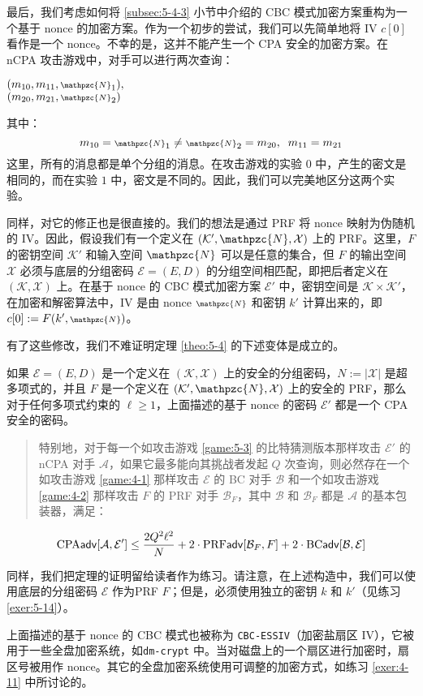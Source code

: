 最后，我们考虑如何将 \ref{subsec:5-4-3} 小节中介绍的 CBC 模式加密方案重构为一个基于 nonce 的加密方案。作为一个初步的尝试，我们可以先简单地将 IV $c[0]$ 看作是一个 nonce。不幸的是，这并不能产生一个 CPA 安全的加密方案。在 nCPA 攻击游戏中，对手可以进行两次查询：

\vspace{5pt}

\hspace*{5pt} $(m_{10},m_{11},{\scriptstyle\mathpzc{N}}_1),$\\
\hspace*{26pt} $(m_{20},m_{21},{\scriptstyle\mathpzc{N}}_2)$

\vspace{5pt}

\noindent
其中：
\[
m_{10}={\scriptstyle\mathpzc{N}}_1\neq{\scriptstyle\mathpzc{N}}_2=m_{20},
\;\;
m_{11}=m_{21}
\]
这里，所有的消息都是单个分组的消息。在攻击游戏的实验 $0$ 中，产生的密文是相同的，而在实验 $1$ 中，密文是不同的。因此，我们可以完美地区分这两个实验。

同样，对它的修正也是很直接的。我们的想法是通过 PRF 将 nonce 映射为伪随机的 IV。因此，假设我们有一个定义在 $(\mathcal{K}',\mathpzc{N},\mathcal{X})$ 上的 PRF。这里，$F$ 的密钥空间 $\mathcal{K}'$ 和输入空间 $\mathpzc{N}$ 可以是任意的集合，但 $F$ 的输出空间 $\mathcal{X}$ 必须与底层的分组密码 $\mathcal{E}=(E,D)$ 的分组空间相匹配，即把后者定义在 $(\mathcal{K},\mathcal{X})$ 上。在基于 nonce 的 CBC 模式加密方案 $\mathcal{E}'$ 中，密钥空间是 $\mathcal{K}\times\mathcal{K}'$，在加密和解密算法中，IV 是由 nonce ${\scriptstyle\mathpzc{N}}$ 和密钥 $k'$ 计算出来的，即 $c[0]:=F(k',{\scriptstyle\mathpzc{N}})$。

有了这些修改，我们不难证明定理 \ref{theo:5-4} 的下述变体是成立的。

\begin{theorem}\label{theo:5-7}
如果 $\mathcal{E}=(E,D)$ 是一个定义在 $(\mathcal{K},\mathcal{X})$ 上的安全的分组密码，$N:=|\mathcal{X}|$ 是超多项式的，并且 $F$ 是一个定义在 $(\mathcal{K}',\mathpzc{N},\mathcal{X})$ 上的安全的 PRF，那么对于任何多项式约束的 $\ell\geq1$，上面描述的基于 nonce 的密码 $\mathcal{E}'$ 都是一个 CPA 安全的密码。
\begin{quote}
特别地，对于每一个如攻击游戏 \ref{game:5-3} 的比特猜测版本那样攻击 $\mathcal{E}'$ 的 nCPA 对手 $\mathcal{A}$，如果它最多能向其挑战者发起 $Q$ 次查询，则必然存在一个如攻击游戏 \ref{game:4-1} 那样攻击 $\mathcal{E}$ 的 BC 对手 $\mathcal{B}$ 和一个如攻击游戏 \ref{game:4-2} 那样攻击 $F$ 的 PRF 对手 $\mathcal{B}_F$，其中 $\mathcal{B}$ 和 $\mathcal{B}_F$ 都是 $\mathcal{A}$ 的基本包装器，满足：
\end{quote}
\begin{equation}\label{eq:5-33}
{\rm CPA}\mathsf{adv}[\mathcal{A},\mathcal{E}']\leq\frac{2Q^2\ell^2}{N}+2\cdot{\rm PRF\mathsf{adv}}[\mathcal{B}_F,F]+2\cdot{\rm BC\mathsf{adv}}[\mathcal{B},\mathcal{E}]
\end{equation}
\end{theorem}

同样，我们把定理的证明留给读者作为练习。请注意，在上述构造中，我们可以使用底层的分组密码 $\mathcal{E}$ 作为PRF $F$；但是，必须使用独立的密钥 $k$ 和 $k'$（见练习 \ref{exer:5-14}）。

上面描述的基于 nonce 的 CBC 模式也被称为 \texttt{CBC-ESSIV}（加密盐扇区 IV），它被用于一些全盘加密系统，如\texttt{dm-crypt} 中。当对磁盘上的一个扇区进行加密时，扇区号被用作 nonce。其它的全盘加密系统使用可调整的加密方式，如练习 \ref{exer:4-11} 中所讨论的。